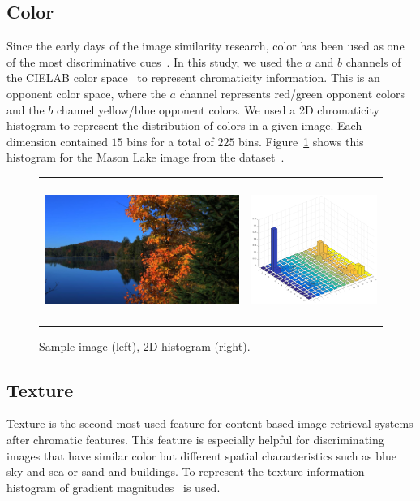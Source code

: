 \subsection{Color}
Since the early days of the image similarity research, color has been used as one of the most discriminative cues~\cite{neumann2006image}. In this study,  we used the $a$ and $b$ channels of the CIELAB color space~\cite{iso201111664} to represent chromaticity information. This is an opponent color space, where the $a$ channel represents red/green opponent colors and the $b$ channel yellow/blue opponent colors. We used a 2D chromaticity histogram to represent the distribution of colors in a given image. Each dimension contained $15$ bins for a total of $225$ bins.  Figure~\ref{fig:hists} shows this histogram for the Mason Lake image from the
dataset~\cite{fairchild2007hdr}.

\begin{figure}
\centering
\caption{Sample image (left), 2D histogram (right).}
\label{fig:hists}
\begin{tabular}{c c}
\includegraphics[height=1.8in]{figures/chapter2/MasonLake.jpg} &
\includegraphics[height=1.8in]{figures/chapter2/57_histab.png}

\end{tabular}
\end{figure}

\subsection{Texture}
Texture is the second most used feature for content based image retrieval systems after chromatic features.  This feature is especially helpful for discriminating images that have similar color but different spatial characteristics such as blue sky and sea or sand and buildings. To represent the texture information histogram of gradient magnitudes~\cite{sharma2015histogram} is used. 
